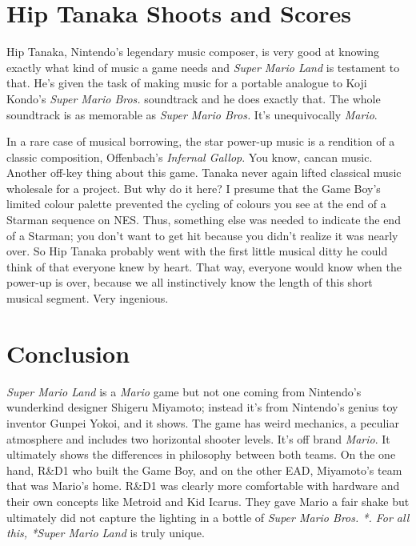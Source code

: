 \documentclass{book}
\begin{document}
\FloatBarrier\section*{Hip Tanaka Shoots and Scores}
Hip Tanaka, Nintendo’s legendary music composer, is very good at knowing exactly what kind of music a game needs and \emph{Super Mario Land} is testament to that. He’s given the task of making music for a portable analogue to Koji Kondo’s \emph{Super Mario Bros.} soundtrack and he does exactly that. The whole soundtrack is as memorable as \emph{Super Mario Bros.} It’s unequivocally \emph{Mario}.\par
In a rare case of musical borrowing, the star power-up music is a rendition of a classic composition, Offenbach’s \emph{Infernal Gallop}. You know, cancan music. Another off-key thing about this game. Tanaka never again lifted classical music wholesale for a project. But why do it here? I presume that the Game Boy’s limited colour palette prevented the cycling of colours you see at the end of a Starman sequence on NES. Thus, something else was needed to indicate the end of a Starman; you don’t want to get hit because you didn’t realize it was nearly over. So Hip Tanaka probably went with the first little musical ditty he could think of that everyone knew by heart. That way, everyone would know when the power-up is over, because we all instinctively know the length of this short musical segment. Very ingenious.\par
\FloatBarrier\section*{Conclusion}
\emph{Super Mario Land} is a \emph{Mario} game but not one coming from Nintendo’s wunderkind designer Shigeru Miyamoto; instead it’s from Nintendo’s genius toy inventor Gunpei Yokoi, and it shows. The game has weird mechanics, a peculiar atmosphere and includes two horizontal shooter levels. It’s off brand \emph{Mario}. It ultimately shows the differences in philosophy between both teams. On the one hand, R\&D1 who built the Game Boy, and on the other EAD, Miyamoto’s team that was Mario’s home. R\&D1 was clearly more comfortable with hardware and their own concepts like Metroid and Kid Icarus. They gave Mario a fair shake but ultimately did not capture the lighting in a bottle of \emph{Super Mario Bros. *. For all this, *Super Mario Land} is truly unique.\par
\end{document}
